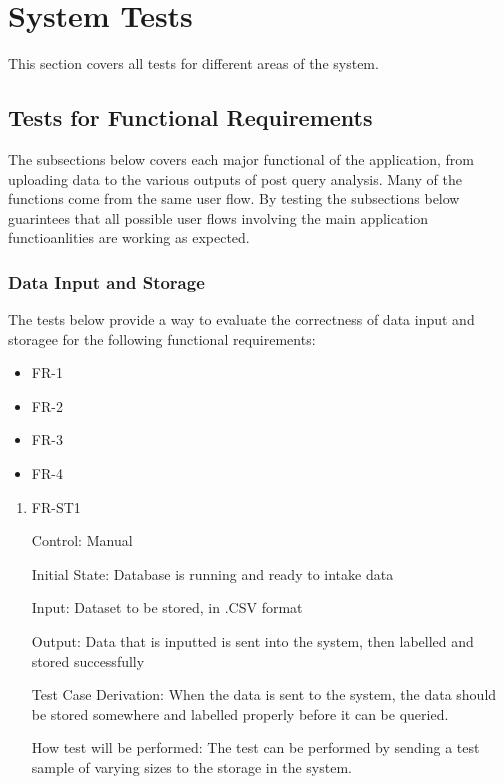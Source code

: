 \documentclass[12pt, titlepage]{article}
\begin{document}


\section{System Tests}
This section covers all tests for different areas of the system.

\subsection{Tests for Functional Requirements}

The subsections below covers each major functional of the application, from uploading data to the various outputs of post query analysis. Many of the functions come from the same user flow. By testing the subsections below guarintees that all possible user flows involving the main application functioanlities are working as expected. 

\subsubsection{Data Input and Storage}
The tests below provide a way to evaluate the correctness of data input and storagee for the following functional requirements:
\begin{itemize}
  \item FR-1
  \item FR-2
  \item FR-3
  \item FR-4
\end{itemize}

\begin{enumerate}

\item{FR-ST1}

Control: Manual
					
Initial State: Database is running and ready to intake data
					
Input: Dataset to be stored, in .CSV format
					
Output: Data that is inputted is sent into the system, then labelled and stored successfully

Test Case Derivation: When the data is sent to the system, the data should be stored somewhere and labelled properly before it can be queried.
					
How test will be performed: The test can be performed by sending a test sample of varying sizes to the storage in the system.

\end{enumerate}
\end{document}
